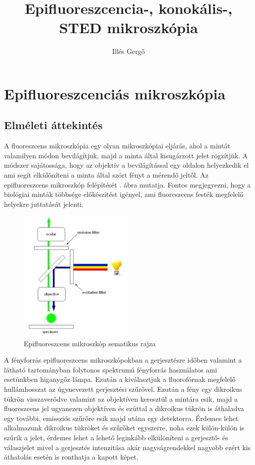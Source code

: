 \documentclass[12pt, a4paper]{article}
\title{\textbf{Epifluoreszcencia-, konokális-, STED mikroszkópia}}
\author{Illés Gergő}
\begin{document}
\maketitle
\section{Epifluoreszcenciás mikroszkópia}
\subsection{Elméleti áttekintés}
A fluoreszcens mikroszkópia egy olyan mikroszkópiai eljárás, ahol a mintát valamilyen módon bevilágítjuk, majd a minta által kisugárzott jelet rögzítjük. A módszer sajátossága, hogy az objektív a bevilágítással egy oldalon helyezkedik el ami segít elkülöníteni a minta által szórt fényt a mérendő jeltől. Az epifluoreszcens mikroszkóp felépítését \az{\ref{epi}}. ábra mutatja. Fontos megjegyezni, hogy a biológiai minták többsége előkészítést igényel, ami fluoreszcens festék megfelelő helyekre juttatását jelenti.
\begin{figure}[H]
\centering
\includegraphics[width=0.5\textwidth]{epi.jpg}
\caption{Epifluoreszcens mikroszkóp sematikus rajza}
\label{epi}
\end{figure}
A fényforrás epifluoreszcens mikroszkópokban a gerjesztésre időben valamint a látható tartományban folytonos spektrumú fényforrás használatos ami esetünkben higanygőz lámpa. Ezután a kiválasztjuk a fluorofórnak megfelelő hullámhosszat az úgynevezett gerjesztési szűrővel. Ezután a fény egy dikroikus tükrön visszaverődve valamint az objektíven keresztül a mintára esik, majd a fluoreszcens jel ugyanezen objektíven és ezúttal a dikroikus tükrön is áthaladva egy további, emissziós szűrőre esik majd utána egy detektorra. Érdemes lehet alkalmazunk dikroikus tükröket és szűrőket egyszerre, noha ezek külön-külön is szűrik a jelet, érdemes lehet a lehető leginkább elkülöníteni a gerjesztő- és válaszjelet mivel a gerjesztés intenzitása akár nagyságrendekkel nagyobb ezért kis áthatolás esetén is ronthatja a kapott képet.
\end{document}

